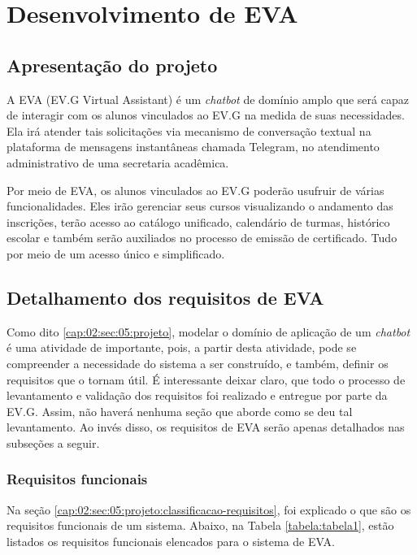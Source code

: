 \chapter{Desenvolvimento de EVA}

\section{Apresentação do projeto}


A EVA (EV.G Virtual Assistant) é um \textit{chatbot} de domínio amplo que será capaz de interagir com os alunos vinculados ao EV.G na medida de suas necessidades.
Ela irá atender tais solicitações via mecanismo de conversação textual na plataforma de mensagens instantâneas chamada Telegram, no atendimento administrativo de uma secretaria acadêmica.

Por meio de EVA, os alunos vinculados ao EV.G poderão usufruir de várias funcionalidades.
Eles irão gerenciar seus cursos visualizando o andamento das inscrições, terão acesso ao catálogo unificado, calendário de turmas, histórico escolar e também serão auxiliados no processo de emissão de certificado. Tudo por meio de um acesso único e simplificado.

\section{Detalhamento dos requisitos de EVA}\label{especificacao-requisitos-eva}

Como dito \ref{cap:02:sec:05:projeto}, modelar o domínio de aplicação de um \textit{chatbot} é uma atividade de importante, pois, a partir desta atividade, pode se compreender a necessidade do sistema a ser construído, e também, definir os requisitos que o tornam útil.
É interessante deixar claro, que todo o processo de levantamento e validação dos requisitos foi realizado e entregue por parte da EV.G. Assim, não haverá nenhuma seção que aborde como se deu tal levantamento. Ao invés disso, os requisitos de EVA serão apenas detalhados nas subseções a seguir.

\subsection{Requisitos funcionais}

Na seção \ref{cap:02:sec:05:projeto:classificacao-requisitos}, foi explicado o que são os requisitos funcionais de um sistema. Abaixo, na Tabela \ref{tabela:tabela1}, estão listados os requisitos funcionais elencados para o sistema de EVA.

